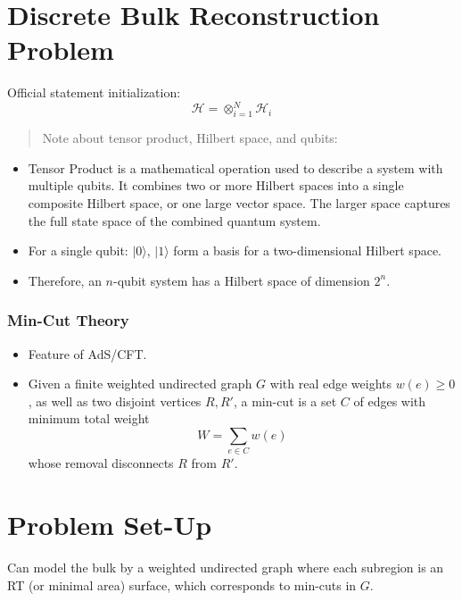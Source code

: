 \documentclass[12pt]{article}
\begin{document}
\section*{Discrete Bulk Reconstruction Problem}
Official statement initialization:
\[
\mathcal{H} = \otimes^{N}_{i=1}\mathcal{H}_{i}
\]
\begin{quote}
    Note about tensor product, Hilbert space, and qubits:
\end{quote}
\begin{itemize}
    \item Tensor Product is a mathematical operation used to describe a system with multiple qubits. It combines two or more Hilbert spaces into a single composite Hilbert space, or one large vector space. The larger space captures the full state space of the combined quantum system.
    \item For a single qubit: $|0\rangle$, $|1\rangle$ form a basis for a two-dimensional Hilbert space.
    \item Therefore, an $n$-qubit system has a Hilbert space of dimension $2^n$.
\end{itemize}

\subsubsection*{Min-Cut Theory}
\begin{itemize}
    \item Feature of AdS/CFT.
    \item Given a finite weighted undirected graph \( G \) with real edge weights \( w(e) \geq 0 \), as well as two disjoint vertices \( R, R' \), a min-cut is a set \( C \) of edges with minimum total weight
    \[
    W = \sum_{e \in C} w(e)
    \]
    whose removal disconnects \( R \) from \( R' \).
\end{itemize}

\section*{Problem Set-Up}
Can model the bulk by a weighted undirected graph where each subregion is an RT (or minimal area) surface, which corresponds to min-cuts in \( G \).
\end{document}
